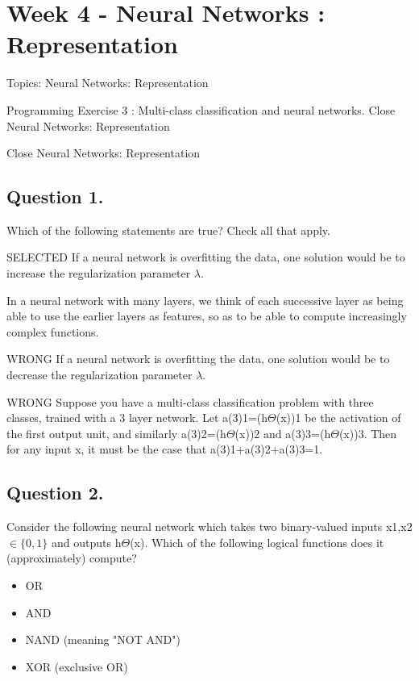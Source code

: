 \documentclass[11pt]{article} %
\begin{document}
	\section{Week 4 - Neural Networks : Representation}
	
	
	Topics: Neural Networks: Representation
	
	Programming Exercise 3 : Multi-class classification and neural networks.
	Close
	Neural Networks: Representation
	
Close
Neural Networks: Representation

\subsection*{Question 1. }
Which of the following statements are true? Check all that apply.

SELECTED If a neural network is overfitting the data, one solution would be to increase the regularization parameter $\lambda$.

In a neural network with many layers, we think of each successive layer as being able to use the earlier layers as features, so as to be able to compute increasingly complex functions.

WRONG If a neural network is overfitting the data, one solution would be to decrease the regularization parameter $\lambda$.

WRONG Suppose you have a multi-class classification problem with three classes, trained with a 3 layer network. Let a(3)1=(h$\Theta$(x))1 be the activation of the first output unit, and similarly a(3)2=(h$\Theta$(x))2 and a(3)3=(h$\Theta$(x))3. Then for any input x, it must be the case that a(3)1+a(3)2+a(3)3=1.


\subsection*{Question 2.} 
Consider the following neural network which takes two binary-valued inputs x1,x2 $\in \{0,1\}$ and outputs h$\Theta$(x). Which of the following logical functions does it (approximately) compute?

\begin{itemize}
	\item OR
	\item AND
	\item NAND (meaning "NOT AND")
	\item XOR (exclusive OR)
\end{itemize}
\end{document}
